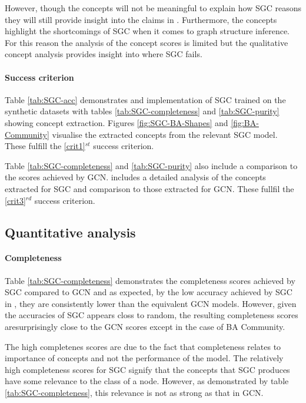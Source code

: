 However, though the concepts will not be meaningful to explain how SGC reasons they will still provide insight into the claims in .
Furthermore, the concepts highlight the shortcomings of SGC when it comes to graph structure inference.
For this reason the analysis of the concept scores is limited but the qualitative concept analysis provides insight into where SGC fails.

\paragraph{Success criterion}
Table \ref{tab:SGC-acc} demonstrates and implementation of SGC trained on the synthetic datasets with tables \ref{tab:SGC-completeness} and \ref{tab:SGC-purity} showing concept extraction.
Figures \ref{fig:SGC-BA-Shapes} and \ref{fig:BA-Community} visualise the extracted concepts from the relevant SGC model. These fulfill the \ref{crit1}$^{st}$ success criterion.

Table \ref{tab:SGC-completeness} and \ref{tab:SGC-purity} also include a comparison to the scores achieved by GCN.
 includes a detailed analysis of the concepts extracted for SGC and comparison to those extracted for GCN.
These fullfil the \ref{crit3}$^{rd}$ success criterion.

\subsection{Quantitative analysis}
\label{sec:quant}
\paragraph{Completeness}


Table \ref{tab:SGC-completeness} demonstrates the completeness scores achieved by SGC compared to GCN and as expected, by the low accuracy achieved by SGC in , they are consistently lower than the equivalent GCN models.
However, given the accuracies of SGC appears closs to random, the resulting completeness scores aresurprisingly close to the GCN scores except in the case of BA Community.

The high completenes scores are due to the fact that completeness relates to importance of concepts and not the performance of the model.
The relatively high completeness scores for SGC signify that the concepts that SGC produces have some relevance to the class of a node.
However, as demonstrated by table \ref{tab:SGC-completeness}, this relevance is not as strong as that in GCN.


